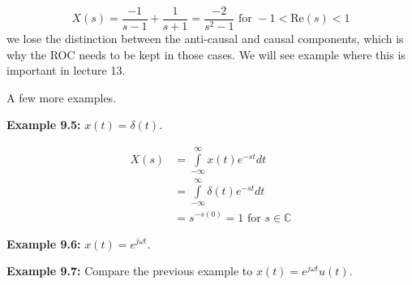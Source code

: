 \documentclass{article}
\begin{document}
\[
X(s) = \frac{-1}{s-1} + \frac{1}{s+1} = \frac{-2}{s^2 - 1} \text{ for } -1 < \text{Re}(s) < 1
\]
we lose the distinction between the anti-causal and causal components, which is why the ROC needs to be kept in those cases. We will see example where this is important in lecture 13.

A few more examples.

\textbf{Example 9.5:} $x(t) = \delta(t)$.

\begin{align}
  X(s) &= \int\limits_{-\infty}^{\infty} x(t) e^{-st} dt\\
  &= \int\limits_{-\infty}^{\infty} \delta(t) e^{-st} dt\\
  &= s^{-s(0)} = 1\text{ for } s\in\mathbb{C}
\end{align}

\textbf{Example 9.6:} $x(t) = e^{j\omega t}$.


\textbf{Example 9.7:} Compare the previous example to $x(t) = e^{j\omega t}u(t)$.
\end{document}

